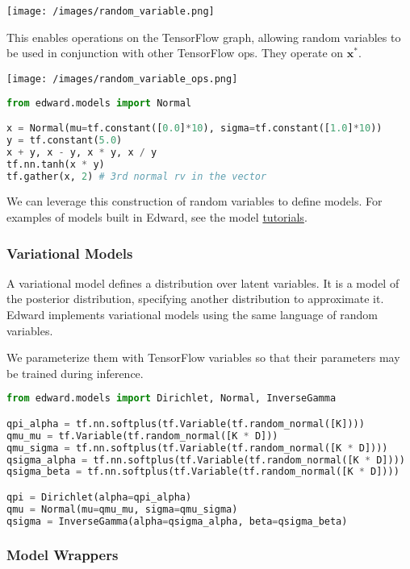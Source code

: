 \texttt{[image: /images/random\_variable.png]}

This enables operations on the TensorFlow graph, allowing random
variables to be used in conjunction with other TensorFlow ops. They
operate on $\mathbf{x}^*$.

\texttt{[image: /images/random\_variable\_ops.png]}

\begin{lstlisting}[language=Python]
from edward.models import Normal

x = Normal(mu=tf.constant([0.0]*10), sigma=tf.constant([1.0]*10))
y = tf.constant(5.0)
x + y, x - y, x * y, x / y
tf.nn.tanh(x * y)
tf.gather(x, 2) # 3rd normal rv in the vector
\end{lstlisting}

We can leverage this construction of random variables to define
models.
For examples of models built in Edward, see the model
\href{/tutorials/}{tutorials}.

\subsubsection{Variational Models}

A variational model defines a distribution over latent variables. It
is a model of the posterior distribution, specifying another
distribution to approximate it.
Edward implements variational models using the same language of random
variables.

We parameterize them with TensorFlow variables so that their
parameters may be trained during inference.

\begin{lstlisting}[language=Python]
from edward.models import Dirichlet, Normal, InverseGamma

qpi_alpha = tf.nn.softplus(tf.Variable(tf.random_normal([K])))
qmu_mu = tf.Variable(tf.random_normal([K * D]))
qmu_sigma = tf.nn.softplus(tf.Variable(tf.random_normal([K * D])))
qsigma_alpha = tf.nn.softplus(tf.Variable(tf.random_normal([K * D])))
qsigma_beta = tf.nn.softplus(tf.Variable(tf.random_normal([K * D])))

qpi = Dirichlet(alpha=qpi_alpha)
qmu = Normal(mu=qmu_mu, sigma=qmu_sigma)
qsigma = InverseGamma(alpha=qsigma_alpha, beta=qsigma_beta)
\end{lstlisting}

\subsubsection{Model Wrappers}


